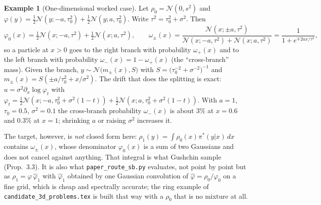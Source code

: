 \documentclass[11pt]{article}
\newcommand{\code}[1]{\texttt{#1}}
\newcommand{\Nc}{\mathcal{N}}
\newcommand{\hphi}{\hat\varphi}
\theoremstyle{definition}
\newtheorem{example}[definition]{Example}
\theoremstyle{plain}
\begin{document}
\begin{example}[One-dimensional worked case]
\label{ex:1d}
Let $\rho_0=\Nc(0,s^2)$ and $\varphi(y)=\tfrac12\Nc(y;-a,\tau_0^2)+\tfrac12\Nc(y;a,\tau_0^2)$.
Write $\tau^2=\tau_0^2+\sigma^2$. Then
\[
  \varphi_0(x)=\tfrac12\Nc(x;-a,\tau^2)+\tfrac12\Nc(x;a,\tau^2),\qquad
  \omega_\pm(x)=\frac{\Nc(x;\pm a,\tau^2)}{\Nc(x;-a,\tau^2)+\Nc(x;a,\tau^2)}=\frac{1}{1+e^{\mp2ax/\tau^2}},
\]
so a particle at $x>0$ goes to the right branch with probability $\omega_+(x)$ and to the
left branch with probability $\omega_-(x)=1-\omega_+(x)$ (the ``cross-branch'' mass). Given
the branch, $y\sim\Nc\big(m_\pm(x),S\big)$ with
$S=\big(\tau_0^{-2}+\sigma^{-2}\big)^{-1}$ and $m_\pm(x)=S(\pm a/\tau_0^2+x/\sigma^2)$.
The drift that does the splitting is exact: $u=\sigma^2\partial_x\log\varphi_t$ with
$\varphi_t=\tfrac12\Nc(x;-a,\tau_0^2+\sigma^2(1-t))+\tfrac12\Nc(x;a,\tau_0^2+\sigma^2(1-t))$.
With $a=1$, $\tau_0=0.5$, $\sigma^2=0.1$ the cross-branch probability $\omega_-(x)$ is
about $3\%$ at $x=0.6$ and $0.3\%$ at $x=1$; shrinking $a$ or raising $\sigma^2$ increases it.

The target, however, is \emph{not} closed form here: $\rho_1(y)=\int\rho_0(x)\pi^*(y|x)\,dx$
contains $\omega_\pm(x)$, whose denominator $\varphi_0(x)$ is a sum of two Gaussians and does
not cancel against anything. That integral is what Gushchin sample (Prop.\ 3.3). It is also
what \code{paper\_route\_sb.py} evaluates, not point by point but as $\rho_1=\varphi\,\hphi_1$
with $\hphi_1$ obtained by one Gaussian convolution of $\hphi=\rho_0/\varphi_0$ on a fine grid,
which is cheap and spectrally accurate; the ring example of
\code{candidate\_3d\_problems.tex} is built that way with a $\rho_0$ that is no mixture at all.


\end{example}
\end{document}
